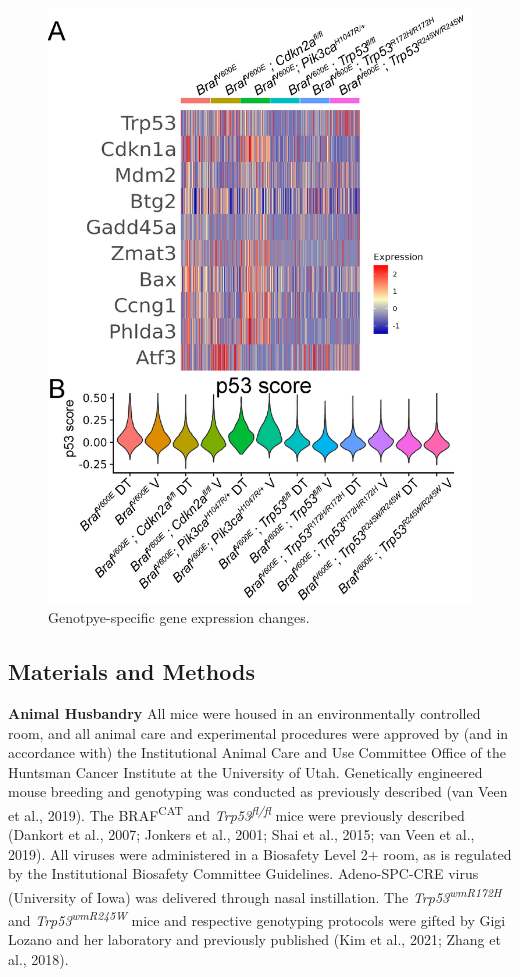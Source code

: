 \begin{figure}
\hypertarget{fig:04}{%
\centering
\includegraphics[width=1\textwidth,height=\textheight]{images/scrna_6.png}
\caption{Genotpye-specific gene expression changes.}\label{fig:04}
}
\end{figure}

\hypertarget{materials-and-methods}{%
\subsection{Materials and Methods}\label{materials-and-methods}}

\textbf{Animal Husbandry} All mice were housed in an environmentally controlled room, and all animal care and experimental procedures were approved by (and in accordance with) the Institutional Animal Care and Use Committee Office of the Huntsman Cancer Institute at the University of Utah. Genetically engineered mouse breeding and genotyping was conducted as previously described (van Veen et al., 2019). The BRAF\textsuperscript{CAT} and \emph{Trp53\textsuperscript{fl/fl}} mice were previously described (Dankort et al., 2007; Jonkers et al., 2001; Shai et al., 2015; van Veen et al., 2019). All viruses were administered in a Biosafety Level 2+ room, as is regulated by the Institutional Biosafety Committee Guidelines. Adeno-SPC-CRE virus (University of Iowa) was delivered through nasal instillation. The \emph{Trp53\textsuperscript{wmR172H}} and \emph{Trp53\textsuperscript{wmR245W}} mice and respective genotyping protocols were gifted by Gigi Lozano and her laboratory and previously published (Kim et al., 2021; Zhang et al., 2018).

